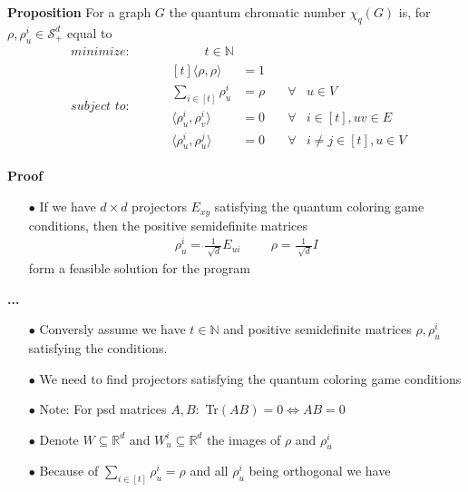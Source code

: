 \documentclass[13.5pt]{beamer}
\begin{document}
\begin{frame}
\begin{block}{\color{colorblue}\textbf{Proposition}}
For a graph $G$ the quantum chromatic number $\chi_q(G)$ is, for $\rho, \rho_u^i \in \mathcal{S}_+^d$ equal to 
	\begin{equation*} 
	\begin{alignedat}{2}
	& \textit{minimize: } & &  \qquad \quad t \in \mathbb{N} \\
	& \textit{subject to: }& \quad   &\begin{aligned}[t] \langle \rho, \rho \rangle &  = 1  &  &  \\
	\sum\limits_{i\in [t]} \rho_{u}^i  & = \rho & \quad \forall &u \in V \\
	\langle \rho_{u}^i, \rho_{v}^i \rangle   & =0 & \quad \forall & i \in [t], uv \in E \\ 
	\langle \rho_{u}^i, \rho_{u}^j \rangle   & =0 & \quad \forall & i \neq j \in [t], u \in V
	\end{aligned}
	\end{alignedat}
	\end{equation*}
\end{block}
\end{frame}

\begin{frame}
\begin{block}{\color{colororange}\textbf{Proof}}
\begin{itemize}
\item[$\bullet$] If we have $d \times d$ projectors $E_{xy}$ satisfying the quantum coloring game conditions, then the positive semidefinite matrices
\begin{align}
\rho_u^i = \frac{1}{\sqrt[]{d}}E_{ui} \hspace{1cm}
\rho = \frac{1}{\sqrt[]{d}}I
\end{align}
form a feasible solution for the program
\end{itemize}
\end{block}
\end{frame}

\begin{frame}
\begin{block}{\color{colororange}\textbf{...}}
\begin{itemize}
\item[$\bullet$] Conversly assume we have $t \in \mathbb{N}$ and positive semidefinite matrices $\rho , \rho_u^i$ satisfying the conditions. \pause 
\item[$\bullet$] We need to find projectors satisfying the quantum coloring game conditions \pause
\item[$\bullet$] Note: For psd matrices $A,B:$ Tr$(AB)=0 \Leftrightarrow AB=0$ \pause
\item[$\bullet$] Denote $W\subseteq \mathbb{R}^d$ and $W_u^i \subseteq \mathbb{R}^d$ the images of $\rho$ and  $\rho_u^i$ \pause
\item[$\bullet$] Because of $\sum_{i\in [t]} \rho_u^i = \rho$ and all $\rho_u^i$ being orthogonal we have \pause
\end{itemize}
\end{block}
\end{frame}
\end{document}
